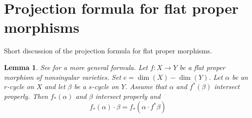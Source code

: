 \documentclass{stacks-project}
\newenvironment{reference}{\comment}{\endcomment}
\theoremstyle{plain}
\newtheorem{lemma}[subsection]{Lemma}
\theoremstyle{definition}
\theoremstyle{remark}
\numberwithin{equation}{subsection}
\begin{document}
\section{Projection formula for flat proper morphisms}
\label{section-projection-formula-flat}

\noindent
Short discussion of the projection formula for flat proper morphisms.

\begin{lemma}
\label{lemma-projection-formula-flat}
\begin{reference}
See \cite[Chapter V, C), Section 7, formula (10)]{Serre_algebre_locale}
for a more general formula.
\end{reference}
Let $f : X \to Y$ be a flat proper morphism of nonsingular varieties.
Set $e = \dim(X) - \dim(Y)$. Let $\alpha$ be an $r$-cycle on $X$ and let
$\beta$ be a $s$-cycle on $Y$. Assume that $\alpha$ and $f^*(\beta)$ intersect
properly. Then $f_*(\alpha)$ and $\beta$ intersect properly and
$$
f_*(\alpha) \cdot \beta = f_*( \alpha \cdot f^*\beta)
$$
\end{lemma}
\end{document}

